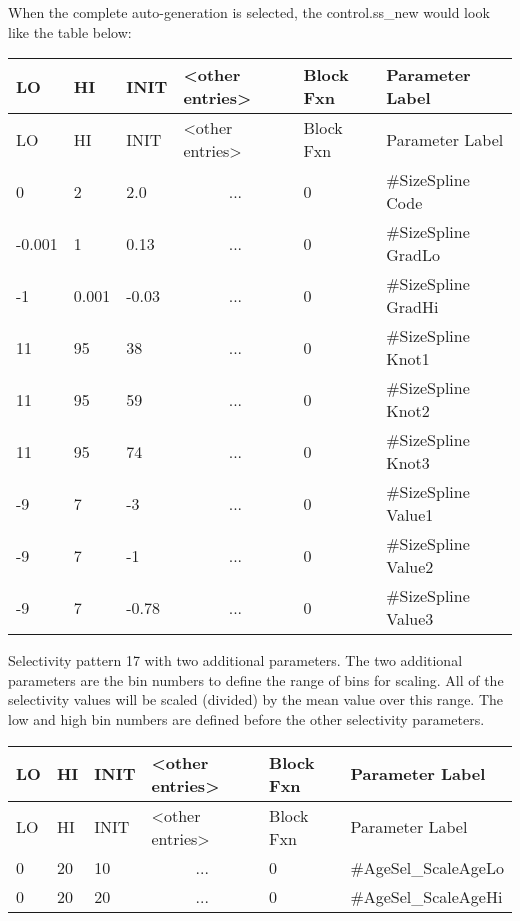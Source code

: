 When the complete auto-generation is selected, the control.ss\_new would look like the table below:	

\begin{longtable}{p{1cm} p{1cm} p{1cm} p{2.9cm}  p{1.9cm}  p{4.2cm}}
	\hline
	LO \Tstrut & HI & INIT  &  <other entries> & Block Fxn & Parameter Label\Bstrut\\
	\hline
	\endfirsthead

	\hline
	LO \Tstrut & HI & INIT & <other entries> & Block Fxn & Parameter Label\Bstrut\\
	\hline
	\endhead

	0 \Tstrut &     2  &   2.0 & \multicolumn{1}{c}{...} & 0 & \#SizeSpline Code\\
	-0.001    & 	 1 &  0.13 & \multicolumn{1}{c}{...} & 0 & \#SizeSpline GradLo\\
	-1        & 0.001  & -0.03 & \multicolumn{1}{c}{...} & 0 & \#SizeSpline GradHi\\
	11        & 	95 & 	38 & \multicolumn{1}{c}{...} & 0 & \#SizeSpline Knot1\\
	11        & 	95 & 	59 & \multicolumn{1}{c}{...} & 0 & \#SizeSpline Knot2\\
	11        & 	95 & 	74 & \multicolumn{1}{c}{...} & 0 & \#SizeSpline Knot3\\
	-9        & 	 7 & 	-3 & \multicolumn{1}{c}{...} & 0 & \#SizeSpline Value1\\
	-9        &   	 7 & 	-1 & \multicolumn{1}{c}{...} & 0 & \#SizeSpline Value2\\
	-9        & 	 7 & -0.78 & \multicolumn{1}{c}{...} & 0 & \#SizeSpline Value3 \Bstrut\\
	\hline
\end{longtable}


Selectivity pattern 17 with two additional parameters. The two additional parameters are the bin numbers to define the range of bins for scaling. All of the selectivity values will be scaled (divided) by the mean value over this range. The low and high bin numbers are defined before the other selectivity parameters.

	\begin{longtable}{p{1cm} p{1cm} p{1cm} p{2.9cm}  p{1.9cm}  p{4.2cm}}
		\hline
		LO \Tstrut & HI & INIT  &  <other entries> & Block Fxn & Parameter Label\Bstrut\\
		\hline
		\endfirsthead
	
		\hline
		LO \Tstrut & HI & INIT & <other entries> & Block Fxn & Parameter Label\Bstrut\\
		\hline
		\endhead

		0 & 20 & 10 & \multicolumn{1}{c}{...} & 0 & \#AgeSel\_ScaleAgeLo \Tstrut\\
		0 & 20 & 20 & \multicolumn{1}{c}{...} & 0 & \#AgeSel\_ScaleAgeHi \Bstrut\\
		\hline
	\end{longtable}

